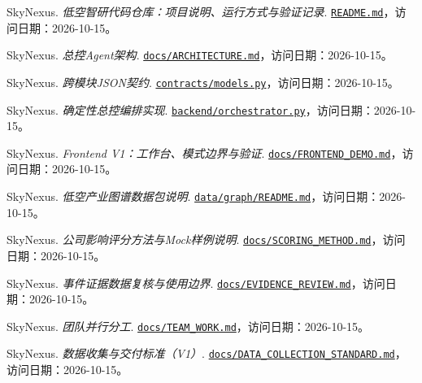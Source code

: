  SkyNexus. \textit{低空智研代码仓库：项目说明、运行方式与验证记录}.
\href{https://github.com/hongyulyu714-prog/low-altitude-investment-agent/blob/a1ed548c5e703262ff2952accb869fe63471b950/README.md}{\texttt{README.md}}，访问日期：2026-10-15。

 SkyNexus. \textit{总控Agent架构}.
\href{https://github.com/hongyulyu714-prog/low-altitude-investment-agent/blob/a1ed548c5e703262ff2952accb869fe63471b950/docs/ARCHITECTURE.md}{\texttt{docs/ARCHITECTURE.md}}，访问日期：2026-10-15。

 SkyNexus. \textit{跨模块JSON契约}.
\href{https://github.com/hongyulyu714-prog/low-altitude-investment-agent/blob/a1ed548c5e703262ff2952accb869fe63471b950/contracts/models.py}{\texttt{contracts/models.py}}，访问日期：2026-10-15。

 SkyNexus. \textit{确定性总控编排实现}.
\href{https://github.com/hongyulyu714-prog/low-altitude-investment-agent/blob/a1ed548c5e703262ff2952accb869fe63471b950/backend/orchestrator.py}{\texttt{backend/orchestrator.py}}，访问日期：2026-10-15。

 SkyNexus. \textit{Frontend V1：工作台、模式边界与验证}.
\href{https://github.com/hongyulyu714-prog/low-altitude-investment-agent/blob/a1ed548c5e703262ff2952accb869fe63471b950/docs/FRONTEND_DEMO.md}{\texttt{docs/FRONTEND\_DEMO.md}}，访问日期：2026-10-15。

 SkyNexus. \textit{低空产业图谱数据包说明}.
\href{https://github.com/hongyulyu714-prog/low-altitude-investment-agent/blob/a1ed548c5e703262ff2952accb869fe63471b950/data/graph/README.md}{\texttt{data/graph/README.md}}，访问日期：2026-10-15。

 SkyNexus. \textit{公司影响评分方法与Mock样例说明}.
\href{https://github.com/hongyulyu714-prog/low-altitude-investment-agent/blob/a1ed548c5e703262ff2952accb869fe63471b950/docs/SCORING_METHOD.md}{\texttt{docs/SCORING\_METHOD.md}}，访问日期：2026-10-15。

 SkyNexus. \textit{事件证据数据复核与使用边界}.
\href{https://github.com/hongyulyu714-prog/low-altitude-investment-agent/blob/a1ed548c5e703262ff2952accb869fe63471b950/docs/EVIDENCE_REVIEW.md}{\texttt{docs/EVIDENCE\_REVIEW.md}}，访问日期：2026-10-15。

 SkyNexus. \textit{团队并行分工}.
\href{https://github.com/hongyulyu714-prog/low-altitude-investment-agent/blob/a1ed548c5e703262ff2952accb869fe63471b950/docs/TEAM_WORK.md}{\texttt{docs/TEAM\_WORK.md}}，访问日期：2026-10-15。

 SkyNexus. \textit{数据收集与交付标准（V1）}.
\href{https://github.com/hongyulyu714-prog/low-altitude-investment-agent/blob/a1ed548c5e703262ff2952accb869fe63471b950/docs/DATA_COLLECTION_STANDARD.md}{\texttt{docs/DATA\_COLLECTION\_STANDARD.md}}，访问日期：2026-10-15。
